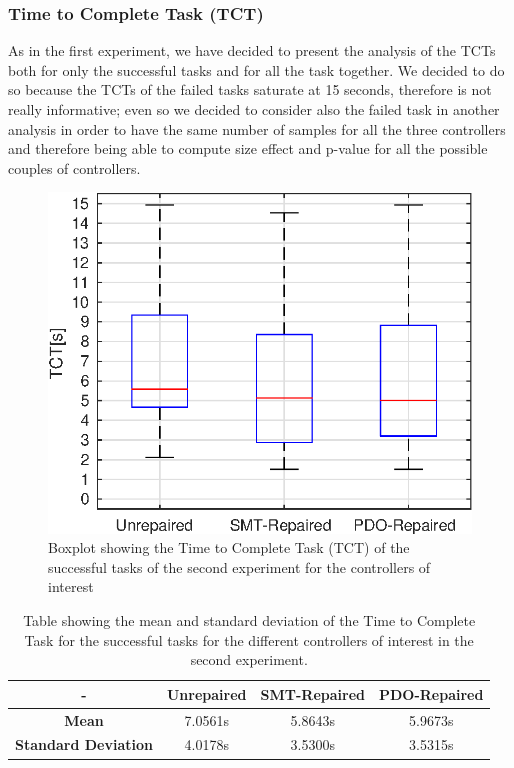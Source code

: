 \subsubsection{Time to Complete Task (TCT)}\label{subsub:second-TCT}
As in the first experiment, we have decided to present the analysis of the TCTs both for only the successful tasks and for all the task together. We decided to do so because the TCTs of the failed tasks saturate at 15 seconds, therefore is not really informative; even so we decided to consider also the failed task in another analysis in order to have the same number of samples for all the three controllers and therefore being able to compute size effect and p-value for all the possible couples of controllers.
\begin{figure}[H]
    \centering
    \includegraphics[width=\textwidth]{Images/second-experiment/exp1_TCT_succ.eps}
    \caption{Boxplot showing the Time to Complete Task (TCT) of the successful tasks of the second experiment for the controllers of interest}
    \label{fig:box-TCT-succ-second}
\end{figure}
\begin{table}[H]
    \centering
    \begin{tabular}{|c|c|c|c|}
        \hline
        - & \textbf{Unrepaired} & \textbf{SMT-Repaired} & \textbf{PDO-Repaired} \\
        \hline
        \textbf{Mean} & 7.0561s & 5.8643s & 5.9673s \\
        \textbf{Standard Deviation} & 4.0178s & 3.5300s & 3.5315s \\
        \hline
    \end{tabular}
    \caption{Table showing the mean and standard deviation of the Time to Complete Task for the successful tasks for the different controllers of interest in the second experiment.}
    \label{tab:TCT-succ-second-mean-std}
\end{table}
